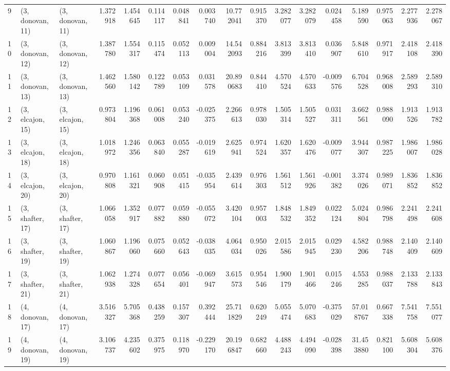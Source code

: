 \begin{tabular}{lllrrrrrrrrrrrrrr}
9  &  (3, donovan, 11) &  (3, donovan, 11) &  1.372918 &  1.454645 &   0.114117 &  0.048841 &  0.003740 &  10.772041 &  0.915370 &   3.282077 &  3.282079 &  0.024458 &   5.189590 &  0.975063 &  2.277936 &  2.278067 \\
10 &  (3, donovan, 12) &  (3, donovan, 12) &  1.387780 &  1.554317 &   0.115474 &  0.052113 &  0.009004 &  14.542093 &  0.884216 &   3.813399 &  3.813410 &  0.036907 &   5.848610 &  0.971917 &  2.418108 &  2.418390 \\
11 &  (3, donovan, 13) &  (3, donovan, 13) &  1.462560 &  1.580142 &   0.122789 &  0.053109 &  0.031578 &  20.890683 &  0.844410 &   4.570524 &  4.570633 & -0.009576 &   6.704528 &  0.968008 &  2.589293 &  2.589310 \\
12 &  (3, elcajon, 15) &  (3, elcajon, 15) &  0.973804 &  1.196368 &   0.061008 &  0.053240 & -0.025375 &   2.266613 &  0.978030 &   1.505314 &  1.505527 &  0.031311 &   3.662561 &  0.988090 &  1.913526 &  1.913782 \\
13 &  (3, elcajon, 18) &  (3, elcajon, 18) &  1.018972 &  1.246356 &   0.063840 &  0.055287 & -0.019619 &   2.625941 &  0.974524 &   1.620357 &  1.620476 & -0.009077 &   3.944307 &  0.987225 &  1.986007 &  1.986028 \\
14 &  (3, elcajon, 20) &  (3, elcajon, 20) &  0.970808 &  1.161321 &   0.060908 &  0.051415 & -0.035954 &   2.439614 &  0.976303 &   1.561512 &  1.561926 & -0.001382 &   3.374026 &  0.989071 &  1.836852 &  1.836852 \\
15 &  (3, shafter, 17) &  (3, shafter, 17) &  1.066058 &  1.352917 &   0.077882 &  0.059880 & -0.055072 &   3.420104 &  0.957003 &   1.848532 &  1.849352 &  0.022124 &   5.024804 &  0.986798 &  2.241498 &  2.241608 \\
16 &  (3, shafter, 19) &  (3, shafter, 19) &  1.060867 &  1.196060 &   0.075660 &  0.052643 & -0.038035 &   4.064034 &  0.950026 &   2.015586 &  2.015945 &  0.029230 &   4.582206 &  0.988748 &  2.140409 &  2.140609 \\
17 &  (3, shafter, 21) &  (3, shafter, 21) &  1.062938 &  1.274328 &   0.077654 &  0.056401 & -0.069947 &   3.615573 &  0.954546 &   1.900179 &  1.901466 &  0.015246 &   4.553285 &  0.988037 &  2.133788 &  2.133843 \\
18 &  (4, donovan, 17) &  (4, donovan, 17) &  3.516327 &  5.705368 &   0.438259 &  0.157307 &  0.392444 &  25.711829 &  0.620249 &   5.055474 &  5.070683 & -0.375029 &  57.018767 &  0.667338 &  7.541758 &  7.551077 \\
19 &  (4, donovan, 19) &  (4, donovan, 19) &  3.106737 &  4.235602 &   0.375975 &  0.118970 & -0.229170 &  20.196847 &  0.682660 &   4.488243 &  4.494090 & -0.028398 &  31.453880 &  0.821100 &  5.608304 &  5.608376 \\

\end{tabular}
